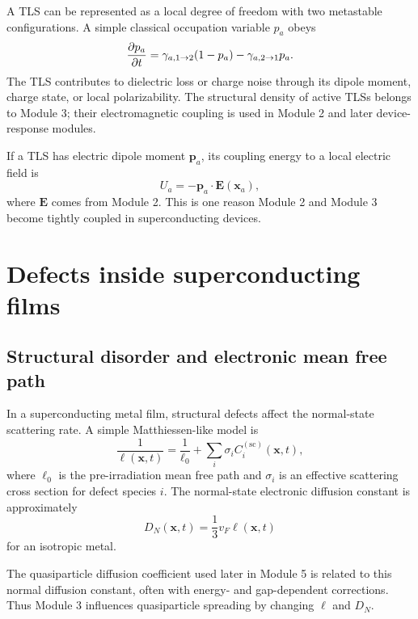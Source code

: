 \documentclass[11pt]{article}
\newcommand{\x}{\mathbf{x}}
\begin{document}
A TLS can be represented as a local degree of freedom with two metastable configurations. A simple classical occupation variable $p_a$ obeys
\begin{equation}
\pdv{p_a}{t}=\gamma_{a,1\rightarrow2}(1-p_a)-\gamma_{a,2\rightarrow1}p_a.
\label{eq:tls_rate}
\end{equation}
The TLS contributes to dielectric loss or charge noise through its dipole moment, charge state, or local polarizability. The structural density of active TLSs belongs to Module 3; their electromagnetic coupling is used in Module 2 and later device-response modules.

If a TLS has electric dipole moment $\mathbf{p}_a$, its coupling energy to a local electric field is
\begin{equation}
U_a=-\mathbf{p}_a\cdot \mathbf{E}(\x_a),
\label{eq:tls_coupling}
\end{equation}
where $\mathbf{E}$ comes from Module 2. This is one reason Module 2 and Module 3 become tightly coupled in superconducting devices.

\section{Defects inside superconducting films}

\subsection{Structural disorder and electronic mean free path}

In a superconducting metal film, structural defects affect the normal-state scattering rate. A simple Matthiessen-like model is
\begin{equation}
\frac{1}{\ell(\x,t)}
=\frac{1}{\ell_0}+\sum_i \sigma_i C_i^{(\mathrm{sc})}(\x,t),
\label{eq:mfp_defects}
\end{equation}
where $\ell_0$ is the pre-irradiation mean free path and $\sigma_i$ is an effective scattering cross section for defect species $i$. The normal-state electronic diffusion constant is approximately
\begin{equation}
D_N(\x,t)=\frac{1}{3}v_F\ell(\x,t)
\label{eq:DN_mfp}
\end{equation}
for an isotropic metal.

The quasiparticle diffusion coefficient used later in Module 5 is related to this normal diffusion constant, often with energy- and gap-dependent corrections. Thus Module 3 influences quasiparticle spreading by changing $\ell$ and $D_N$.
\end{document}
